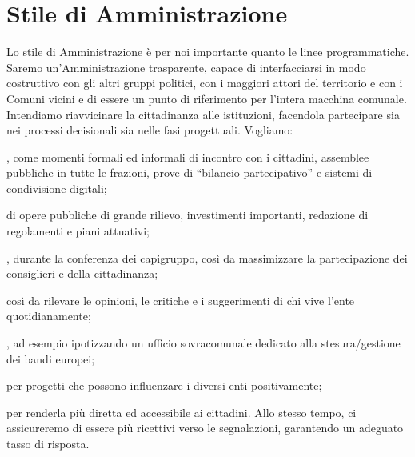 \section{Stile di Amministrazione}
Lo stile di Amministrazione è per noi importante quanto le linee programmatiche. Saremo un'Amministrazione trasparente, capace di interfacciarsi in modo costruttivo con gli altri gruppi politici, con i maggiori attori del territorio e con i Comuni vicini e di essere un punto di riferimento per l'intera macchina comunale. Intendiamo riavvicinare la cittadinanza alle istituzioni, facendola partecipare sia nei processi decisionali sia nelle fasi progettuali. Vogliamo:

, come momenti formali ed informali di incontro con i cittadini, assemblee pubbliche in tutte le frazioni, prove di “bilancio partecipativo” e sistemi di condivisione digitali;

 di opere pubbliche di grande rilievo, investimenti importanti, redazione di regolamenti e piani attuativi;

, durante la conferenza dei capigruppo, così da massimizzare la partecipazione dei consiglieri e della cittadinanza;

 così da rilevare le opinioni, le critiche e i suggerimenti di chi vive l'ente quotidianamente;

, ad esempio ipotizzando un ufficio sovracomunale dedicato alla stesura/gestione dei bandi europei;

 per progetti che possono influenzare i diversi enti positivamente;

 per renderla più diretta ed accessibile ai cittadini. Allo stesso tempo, ci assicureremo di essere più ricettivi verso le segnalazioni, garantendo un adeguato tasso di risposta.
